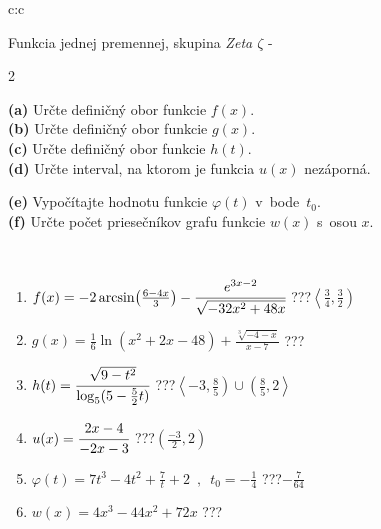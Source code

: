 \documentclass[10pt]{report}
\begin{document}
\begin{tabular}{c:c}
\begin{minipage}[c][104.5mm][t]{0.5\linewidth}
\begin{center}
\vspace{7mm}
{\huge Funkcia jednej premennej, skupina \textit{Zeta $\zeta$} -}\\[5mm]
\begin{minipage}{0.95\linewidth}
\begin{center}
{\small \begin{multicols}{2} \raggedright
\textbf{(a)} Určte definičný obor funkcie \(f(x)\). \\[1mm]
\textbf{(b)} Určte definičný obor funkcie \(g(x)\). \\[1mm]
\textbf{(c)} Určte definičný obor funkcie \(h(t)\). \\[1mm]
\textbf{(d)} Určte interval, na ktorom je funkcia \(u(x)\) nezáporná. \par \columnbreak
\textbf{(e)} Vypočítajte hodnotu funkcie \(\varphi(t)\) v~bode~\(t_0\). \\[1mm]
\textbf{(f)} Určte počet priesečníkov grafu funkcie \(w(x)\) s~osou \(x\). \\[1mm]
\end{multicols}
}
\end{center}
\end{minipage}
\\[4mm]
\begin{minipage}{0.79\linewidth}
\begin{center}
\begin{varwidth}{\linewidth}
\begin{enumerate}
\small
\item $f(x) = -2\arcsin\!\left( \frac{6-4x}{3} \right) - \cfrac{e^{3x-2}}{\sqrt{-32x^2+48x}}$\quad \dotfill\; ???\;\dotfill \quad $\left\langle\frac{3}{4} , \frac{3}{2}\right)$
\item $g(x) = \frac{1}{6} \ln{\!(x^2+2x-48)}+\frac{\sqrt[3]{-4-x}}{x-7}$\quad \dotfill\; ???\;\dotfill {}
\item $h(t) = \cfrac{\sqrt{9-t^2}}{\log_5(5-\frac{5}{2}t)}$\quad \dotfill\; ???\;\dotfill \quad $\left\langle-3 , \frac{8}{5}\right)\cup\left(\frac{8}{5} , 2\right\rangle$
\item $u(x) = \cfrac{2x-4}{-2x-3}$\quad \dotfill\; ???\;\dotfill \quad $\left(\frac{-3}{2} , 2\right)$
\item $\varphi(t) = 7t^3-4t^2+\frac{7}{t}+2 \enspace , \enspace t_0=-\frac{1}{4}$\quad \dotfill\; ???\;\dotfill \quad $-\frac{7}{64}$
\item $w(x) = 4x^3-44x^2+72x$\quad \dotfill\; ???\;\dotfill {}

\end{enumerate}
\end{varwidth}
\end{center}
\end{minipage}
\end{center}
\end{minipage}
\end{tabular}
\end{document}
